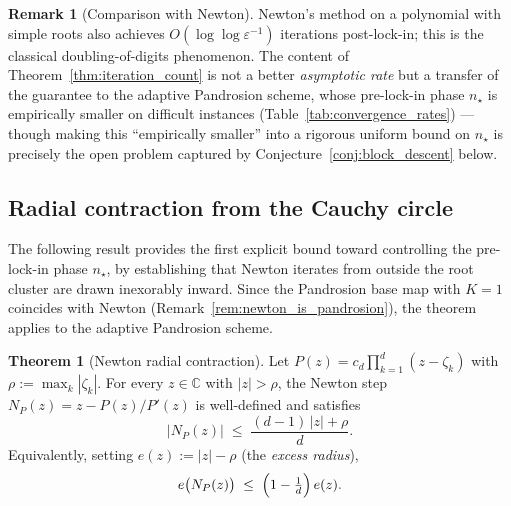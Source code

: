 \documentclass[11pt,a4paper]{article}
\theoremstyle{definition}
\newtheorem{theorem}{Theorem}[section]
\newtheorem{remark}{Remark}[section]
\newcommand{\CC}{\mathbb{C}}
\begin{document}
\begin{remark}[Comparison with Newton]
Newton's method on a polynomial with simple roots also achieves $O(\log\log \varepsilon^{-1})$ iterations post-lock-in; this is the classical doubling-of-digits phenomenon.  The content of Theorem~\ref{thm:iteration_count} is not a better \emph{asymptotic rate} but a transfer of the guarantee to the adaptive Pandrosion scheme, whose pre-lock-in phase $n_\star$ is empirically smaller on difficult instances (Table~\ref{tab:convergence_rates}) --- though making this ``empirically smaller'' into a rigorous uniform bound on $n_\star$ is precisely the open problem captured by Conjecture~\ref{conj:block_descent} below.
\end{remark}

\subsection{Radial contraction from the Cauchy circle}
\label{sec:radial_contraction}

The following result provides the first explicit bound toward controlling the pre-lock-in phase $n_\star$, by establishing that Newton iterates from outside the root cluster are drawn inexorably inward.  Since the Pandrosion base map with $K = 1$ coincides with Newton (Remark~\ref{rem:newton_is_pandrosion}), the theorem applies to the adaptive Pandrosion scheme.

\begin{theorem}[Newton radial contraction]
\label{thm:radial_contraction}
Let $P(z) = c_d\prod_{k=1}^d (z - \zeta_k)$ with $\rho := \max_k |\zeta_k|$.  For every $z \in \CC$ with $|z| > \rho$, the Newton step $N_P(z) = z - P(z)/P'(z)$ is well-defined and satisfies
\begin{equation}
  \label{eq:radial_bound}
  |N_P(z)| \;\leq\; \frac{(d-1)\,|z| + \rho}{d}.
\end{equation}
Equivalently, setting $e(z) := |z| - \rho$ (the \emph{excess radius}),
\begin{equation}
  \label{eq:excess_contraction}
  e\bigl(N_P(z)\bigr) \;\leq\; \Bigl(1 - \tfrac{1}{d}\Bigr)\, e(z).
\end{equation}
\end{theorem}
\end{document}
